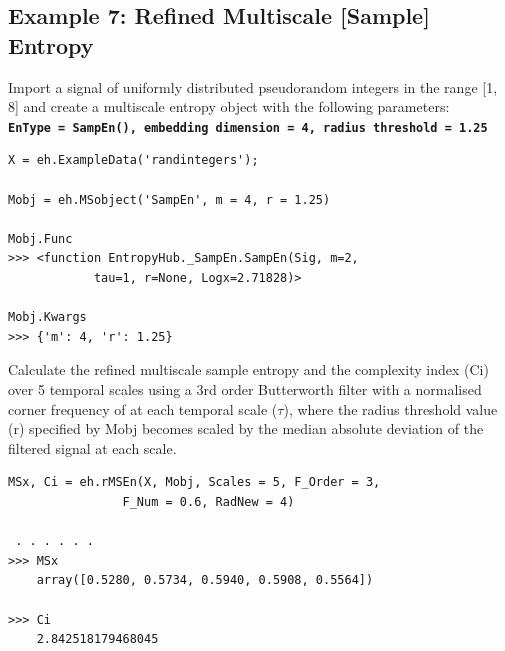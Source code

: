 \documentclass[12pt, a4paper, titlepage, openany]{book}
\begin{document}
\subsection{\normalsize Example 7: \hspace{15mm} Refined Multiscale [Sample] Entropy}
\noindent Import a signal of uniformly distributed pseudorandom integers in the range [1, 8] and create a multiscale entropy object with the following parameters:\\
\textbf{\texttt{EnType =  SampEn(), embedding dimension = 4, radius threshold = 1.25}}
\begin{verbatim}
X = eh.ExampleData('randintegers');

Mobj = eh.MSobject('SampEn', m = 4, r = 1.25)

Mobj.Func
>>> <function EntropyHub._SampEn.SampEn(Sig, m=2,
			tau=1, r=None, Logx=2.71828)>

Mobj.Kwargs
>>> {'m': 4, 'r': 1.25}
\end{verbatim}      
Calculate the refined multiscale sample entropy and the complexity index (Ci) over 5 temporal scales using a 3rd order Butterworth filter with a normalised corner frequency of  at each temporal scale ($\tau$), where the radius threshold value (r) specified by Mobj becomes scaled by the median absolute deviation of the filtered signal at each scale.
\begin{verbatim}
MSx, Ci = eh.rMSEn(X, Mobj, Scales = 5, F_Order = 3, 
                F_Num = 0.6, RadNew = 4)

 . . . . . .
>>> MSx
	array([0.5280, 0.5734, 0.5940, 0.5908, 0.5564])

>>> Ci
	2.842518179468045
\end{verbatim}


\newpage
\end{document}
